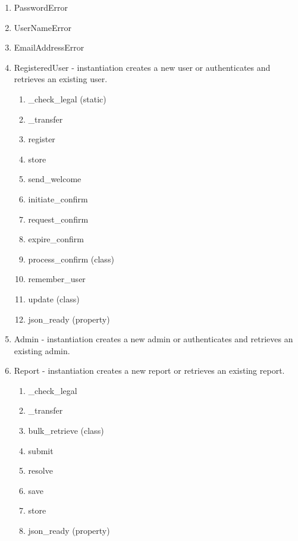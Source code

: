 \documentclass[12pt,letterpaper]{article}
\begin{document}
\begin{enumerate}
\item[] PasswordError
\item[] UserNameError
\item[] EmailAddressError
\item[] RegisteredUser - instantiation creates a new user or authenticates and retrieves an existing user. 
\begin{enumerate}
\item[] \_check\_legal (static)
\item[] \_transfer
\item[] register
\item[] store
\item[] send\_welcome 
\item[] initiate\_confirm
\item[] request\_confirm
\item[] expire\_confirm
\item[] process\_confirm (class)
\item[] remember\_user
\item[] update (class)
\item[] json\_ready (property)
\end{enumerate}
\item[] Admin - instantiation creates a new admin or authenticates and retrieves an existing admin. 
\item[] Report - instantiation creates a new report or retrieves an existing report.
\begin{enumerate}
\item[] \_check\_legal
\item[] \_transfer
\item[] bulk\_retrieve (class)
\item[] submit
\item[] resolve
\item[] save
\item[] store
\item[] json\_ready (property)
\end{enumerate}
\end{enumerate}
\end{document}
